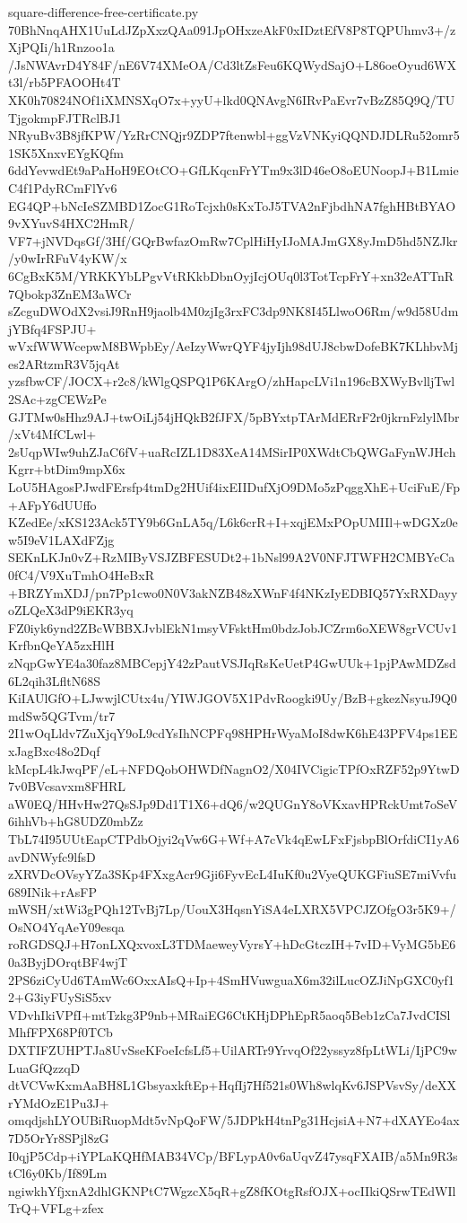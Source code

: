 \documentclass[11pt]{article}
\theoremstyle{definition}
\theoremstyle{remark}
\begin{document}
\begin{filecontents*}[overwrite]{square-difference-free-certificate.py}
70BhNnqAHX1UuLdJZpXxzQAa091JpOHxzeAkF0xIDztEfV8P8TQPUhmv3+/zXjPQIi/h1Rnzoo1a
/JsNWAvrD4Y84F/nE6V74XMeOA/Cd3ltZsFeu6KQWydSajO+L86oeOyud6WXt3l/rb5PFAOOHt4T
XK0h70824NOf1iXMNSXqO7x+yyU+lkd0QNAvgN6IRvPaEvr7vBzZ85Q9Q/TUTjgokmpFJTRclBJ1
NRyuBv3B8jfKPW/YzRrCNQjr9ZDP7ftenwbl+ggVzVNKyiQQNDJDLRu52omr51SK5XnxvEYgKQfm
6ddYevwdEt9aPaHoH9EOtCO+GfLKqcnFrYTm9x3lD46eO8oEUNoopJ+B1LmieC4f1PdyRCmFlYv6
EG4QP+bNcIeSZMBD1ZocG1RoTcjxh0sKxToJ5TVA2nFjbdhNA7fghHBtBYAO9vXYuvS4HXC2HmR/
VF7+jNVDqsGf/3Hf/GQrBwfazOmRw7CplHiHyIJoMAJmGX8yJmD5hd5NZJkr/y0wIrRFuV4yKW/x
6CgBxK5M/YRKKYbLPgvVtRKkbDbnOyjIcjOUq0l3TotTcpFrY+xn32eATTnR7Qbokp3ZnEM3aWCr
sZcguDWOdX2vsiJ9RnH9jaolb4M0zjIg3rxFC3dp9NK8I45LlwoO6Rm/w9d58UdmjYBfq4FSPJU+
wVxfWWWcepwM8BWpbEy/AeIzyWwrQYF4jyIjh98dUJ8cbwDofeBK7KLhbvMjes2ARtzmR3V5jqAt
yzsfbwCF/JOCX+r2c8/kWlgQSPQ1P6KArgO/zhHapcLVi1n196cBXWyBvlljTwl2SAc+zgCEWzPe
GJTMw0sHhz9AJ+twOiLj54jHQkB2fJFX/5pBYxtpTArMdERrF2r0jkrnFzlylMbr/xVt4MfCLwl+
2sUqpWIw9uhZJaC6fV+uaRcIZL1D83XeA14MSirIP0XWdtCbQWGaFynWJHchKgrr+btDim9mpX6x
LoU5HAgosPJwdFErsfp4tmDg2HUif4ixEIIDufXjO9DMo5zPqggXhE+UciFuE/Fp+AFpY6dUUffo
KZedEe/xKS123Ack5TY9b6GnLA5q/L6k6crR+I+xqjEMxPOpUMIIl+wDGXz0ew5I9eV1LAXdFZjg
SEKnLKJn0vZ+RzMIByVSJZBFESUDt2+1bNsl99A2V0NFJTWFH2CMBYcCa0fC4/V9XuTmhO4HeBxR
+BRZYmXDJ/pn7Pp1cwo0N0V3akNZB48zXWnF4f4NKzIyEDBIQ57YxRXDayyoZLQeX3dP9iEKR3yq
FZ0iyk6ynd2ZBcWBBXJvblEkN1msyVFsktHm0bdzJobJCZrm6oXEW8grVCUv1KrfbnQeYA5zxHlH
zNqpGwYE4a30faz8MBCepjY42zPautVSJIqRsKeUetP4GwUUk+1pjPAwMDZsd6L2qih3LfltN68S
KiIAUlGfO+LJwwjlCUtx4u/YIWJGOV5X1PdvRoogki9Uy/BzB+gkezNsyuJ9Q0mdSw5QGTvm/tr7
2I1wOqLldv7ZuXjqY9oL9cdYsIhNCPFq98HPHrWyaMoI8dwK6hE43PFV4ps1EExJagBxc48o2Dqf
kMcpL4kJwqPF/eL+NFDQobOHWDfNagnO2/X04IVCigicTPfOxRZF52p9YtwD7v0BVcsavxm8FHRL
aW0EQ/HHvHw27QsSJp9Dd1T1X6+dQ6/w2QUGnY8oVKxavHPRckUmt7oSeV6ihhVb+hG8UDZ0mbZz
TbL74I95UUtEapCTPdbOjyi2qVw6G+Wf+A7cVk4qEwLFxFjsbpBlOrfdiCI1yA6avDNWyfc9lfsD
zXRVDcOVsyYZa3SKp4FXxgAcr9Gji6FyvEcL4IuKf0u2VyeQUKGFiuSE7miVvfu689INik+rAsFP
mWSH/xtWi3gPQh12TvBj7Lp/UouX3HqsnYiSA4eLXRX5VPCJZOfgO3r5K9+/OsNO4YqAeY09esqa
roRGDSQJ+H7onLXQxvoxL3TDMaeweyVyrsY+hDcGtczIH+7vID+VyMG5bE60a3ByjDOrqtBF4wjT
2PS6ziCyUd6TAmWc6OxxAIsQ+Ip+4SmHVuwguaX6m32ilLucOZJiNpGXC0yf12+G3iyFUySiS5xv
VDvhIkiVPfI+mtTzkg3P9nb+MRaiEG6CtKHjDPhEpR5aoq5Beb1zCa7JvdCISlMhfFPX68Pf0TCb
DXTIFZUHPTJa8UvSseKFoeIcfsLf5+UilARTr9YrvqOf22yssyz8fpLtWLi/IjPC9wLuaGfQzzqD
dtVCVwKxmAaBH8L1GbsyaxkftEp+HqfIj7Hf521s0Wh8wlqKv6JSPVsvSy/deXXrYMdOzE1Pu3J+
omqdjshLYOUBiRuopMdt5vNpQoFW/5JDPkH4tnPg31HcjsiA+N7+dXAYEo4ax7D5OrYr8SPjl8zG
I0qjP5Cdp+iYPLaKQHfMAB34VCp/BFLypA0v6aUqvZ47ysqFXAIB/a5Mn9R3stCl6y0Kb/If89Lm
ngiwkhYfjxnA2dhlGKNPtC7WgzcX5qR+gZ8fKOtgRsfOJX+ocIIkiQSrwTEdWIlTrQ+VFLg+zfex

\end{filecontents*}
\end{document}
